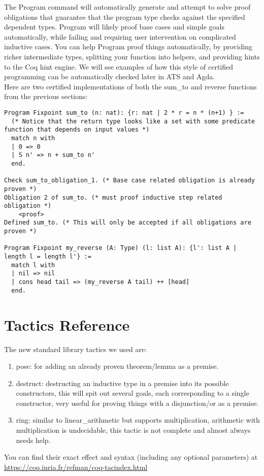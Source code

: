 \documentclass{article}
\begin{document}
The Program command will automatically generate and attempt to solve proof obligations that guarantee that the program type checks against the specified dependent types.
Program will likely proof base cases and simple goals automatically, while failing and requiring user intervention on complicated inductive cases. You can help
Program proof things automatically, by providing richer intermediate types, splitting your function into helpers, and providing hints to the Coq hint engine.
We will see examples of how this style of certified programming can be automatically checked later in ATS and Agda. \\

Here are two certified implementations of both the sum\_to and reverse functions from the previous sections:
\begin{verbatim}
Program Fixpoint sum_to (n: nat): {r: nat | 2 * r = n * (n+1) } :=
  (* Notice that the return type looks like a set with some predicate function that depends on input values *)
  match n with
  | 0 => 0
  | S n' => n + sum_to n'
  end.

Check sum_to_obligation_1. (* Base case related obligation is already proven *)
Obligation 2 of sum_to. (* must proof inductive step related obligation *)
    <proof>
Defined sum_to. (* This will only be accepted if all obligations are proven *)

Program Fixpoint my_reverse (A: Type) (l: list A): {l': list A | length l = length l'} :=
  match l with
  | nil => nil
  | cons head tail => (my_reverse A tail) ++ [head]
  end.
\end{verbatim}

\section{Tactics Reference}
The new standard library tactics we used are: \begin{enumerate}
    \item pose: for adding an already proven theorem/lemma as a premise.
    \item destruct: destructing an inductive type in a premise into its possible constructors, this will spit out several goals, each corresponding to a single constructor, very useful for proving things with a disjunction/or as a premise.
    \item ring: similar to linear\_arithmetic but supports multiplication, arithmetic with multiplication is undecidable, this tactic is not complete and almost always needs help.
\end{enumerate}
You can find their exact effect and syntax (including any optional parameters) at \href{https://coq.inria.fr/refman/coq-tacindex.html}{https://coq.inria.fr/refman/coq-tacindex.html} \\
\end{document}
